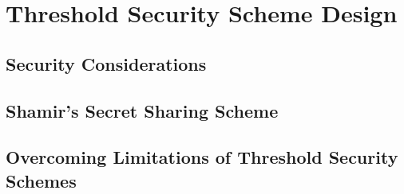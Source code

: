 \chapter{Threshold Security Scheme Design}\label{C:threshholdSecurityDesign}

\section{Security Considerations}

\section{Shamir's Secret Sharing Scheme}

\section{Overcoming Limitations of Threshold Security Schemes}